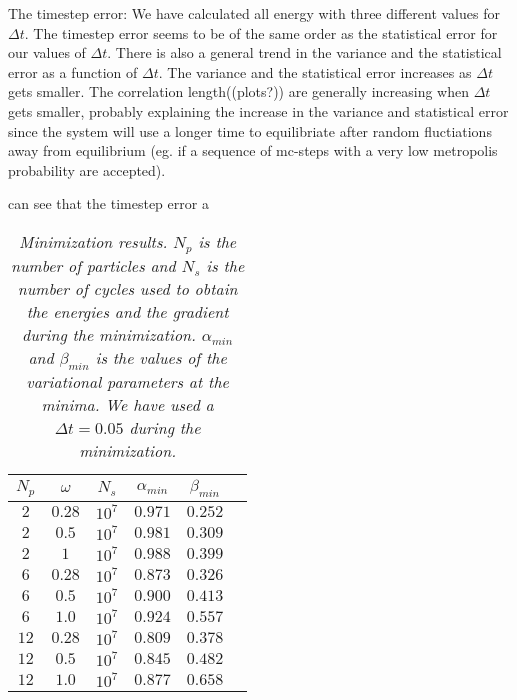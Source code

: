 \documentclass[a4paper,10pt,twocolumn]{article} %
\begin{document}
The timestep error: We have calculated all energy with three different values for $\Delta t$. 
The timestep error seems to be of the same order as the statistical error for our values of $\Delta t$. 
There is also a general trend in the variance and the statistical error as a function of $\Delta t$. The variance and the statistical error increases as $\Delta t$ gets smaller.
The correlation length((plots?)) are generally increasing when $\Delta t$ gets smaller, probably explaining the increase in the variance and statistical error since the system will use a longer
time to equilibriate after random fluctiations away from equilibrium (eg. if a sequence of mc-steps with a very low metropolis probability are accepted).
%





 can see that the timestep error   a 


\begin{table}[h!]
\begin{center}
\begin{tabular}{|c|c|c|c|c|c|}
\hline
$N_{p}$ & $\omega$ & $N_{s}$ & $\alpha_{min}$ & $\beta_{min}$ \\ 
\hline
\hline
 $2$  & $0.28$ & $10^7$ & $0.971$ & $0.252$ \\ 
 $2$  & $0.5$  & $10^7$ & $0.981$ & $0.309$ \\ 
 $2$  & $1$    & $10^7$ & $0.988$ & $0.399$ \\ 	 
\hline
 $6$  & $0.28$ & $10^7$ & $0.873$ & $0.326$ \\ 
 $6$  & $0.5$  & $10^7$ & $0.900$ & $0.413$ \\ 
 $6$  & $1.0$  & $10^7$ & $0.924$ & $0.557$ \\ 
\hline
 $12$ & $0.28$ & $10^7$ & $0.809$ & $0.378$ \\ 
 $12$ & $0.5$  & $10^7$ & $0.845$ & $0.482$ \\ 
 $12$ & $1.0$  & $10^7$ & $0.877$ & $0.658$ \\ 
\hline
\end{tabular}
\end{center}
\caption{{\it 
	Minimization results. $N_p$ is the number of particles and $N_s$ is the number of cycles used to obtain the energies and the gradient during the minimization.
	$\alpha_{min}$ and $\beta_{min}$ is the values of the variational parameters at the minima. 
	We have used a $\Delta t=0.05$ during the minimization. 
}}
\label{tab1}
\end{table}
\end{document}
